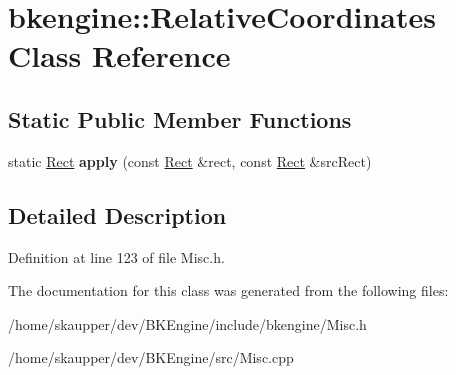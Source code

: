 \hypertarget{classbkengine_1_1RelativeCoordinates}{}\section{bkengine\+:\+:Relative\+Coordinates Class Reference}
\label{classbkengine_1_1RelativeCoordinates}
\subsection*{Static Public Member Functions}
\begin{DoxyCompactItemize}
\item 
\mbox{\label{classbkengine_1_1RelativeCoordinates_a91abcdf513c8228b0b3fa684cd7ce3e2}} 
static \hyperlink{structbkengine_1_1Rect}{Rect} {\bfseries apply} (const \hyperlink{structbkengine_1_1Rect}{Rect} \&rect, const \hyperlink{structbkengine_1_1Rect}{Rect} \&src\+Rect)
\end{DoxyCompactItemize}


\subsection{Detailed Description}


Definition at line 123 of file Misc.\+h.



The documentation for this class was generated from the following files\+:\begin{DoxyCompactItemize}
\item 
/home/skaupper/dev/\+B\+K\+Engine/include/bkengine/Misc.\+h\item 
/home/skaupper/dev/\+B\+K\+Engine/src/Misc.\+cpp\end{DoxyCompactItemize}
